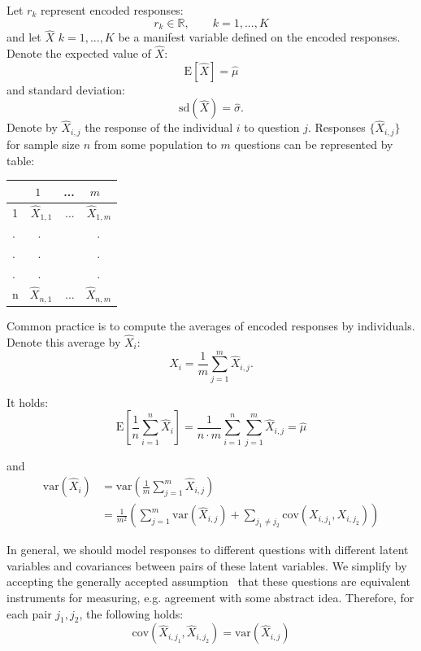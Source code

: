 \documentclass[10pt]{article}
\begin{document}
Let $r_{k}$ represent encoded responses:
\begin{equation}
r_{k} \in \mathbb{R}, \qquad k = 1,...,K
\end{equation}
and let $\hat{X}$  $k = 1,..., K$ be a manifest variable defined on the encoded responses. Denote the expected value of $\hat{X}$: 
$$
\mathrm{E}[\hat{X}] = \hat{\mu}
$$ and standard deviation:
$$
\mathrm{sd}(\hat{X}) = \hat{\sigma}.
$$
Denote by $\hat{X}_{i, j}$ the response of the individual $i$ to question $j$. Responses $\lbrace \hat{X}_{i, j} \rbrace$ for sample size $n$ from some population to $m$ questions can be represented by table:
\begin{center}
\begin{tabular}{l|rrr}
     & $1 \quad$ & ... & $m \quad$ \\ 
  \hline
  1 & $\hat{X}_{1,1}$ & ... & $\hat{X}_{1,m}$ \rule{0pt}{3ex} \\
  $.$ &  $. \quad$ & & $. \quad$ \rule{0pt}{0.05ex} \\
  $.$ &  $. \quad$ & & $. \quad$ \rule{0pt}{0.05ex} \\
  $.$ &  $. \quad$ & & $. \quad$ \rule{0pt}{0.05ex} \\
  n & $\hat{X}_{n,1}$ & ... & $\hat{X}_{n,m}$ \rule{0pt}{3ex} \end{tabular}
\end{center}

Common practice is to compute the averages of encoded responses by individuals. Denote this average by $\hat{X}_{i}$:
\begin{equation}
\hat{X}_{i} = \frac{1}{m} \sum_{j = 1}^{m} \hat{X}_{i, j}.
\end{equation}

It holds:
\begin{equation}
\mathrm{E}[\frac{1}{n} \sum_{i=1}^{n} \hat{X}_{i}] = \frac{1}{n \cdot m} \sum	_{i=1}^{n} \sum_{j=1}^{m} \hat{X}_{i,j} = \hat{\mu}
\end{equation}

and
\begin{align*}
\mathrm{var}(\hat{X}_{i}) &= \mathrm{var} \left( \frac{1}{m} \sum_{j=1}^{m} \hat{X}_{i, j} \right) \\
&= \frac{1}{m^{2}} \left( \sum_{j=1}^{m} \mathrm{var}(\hat{X}_{i,j}) + \sum_{j_{1} \neq j_{2}} \mathrm{cov}(X_{i,j_{1}}, X_{i, j_{2}})
\right)
\end{align*}

In general, we should model responses to different questions with different latent variables and covariances between pairs of these latent variables. We simplify by accepting the generally accepted assumption~\cite{Alphen} that these questions are equivalent instruments for measuring, e.g. agreement with some abstract idea. Therefore, for each pair $j_{1}, j_{2}$, the following holds:
\begin{equation}
\mathrm{cov}(\hat{X}_{i,j_{1}}, \hat{X}_{i, j_{2}}) = \mathrm{var}(\hat{X}_{i, j})
\end{equation}
\end{document}
